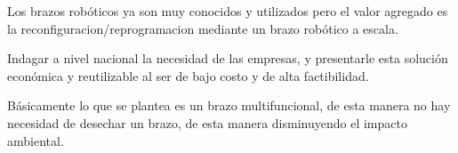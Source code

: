 \documentclass[gra_conf.tex]{subfiles}
\begin{document}
Los brazos robóticos ya son muy conocidos y utilizados pero el
valor agregado es la reconfiguracion/reprogramacion mediante un
brazo robótico a escala.

Indagar a nivel nacional la necesidad de las empresas, y presentarle
esta solución económica y reutilizable al ser de bajo costo y de alta 
factibilidad.
   
Básicamente lo que se plantea es un brazo multifuncional, de esta manera
no hay necesidad de desechar un brazo, de esta manera disminuyendo el 
impacto ambiental.
\end{document}
